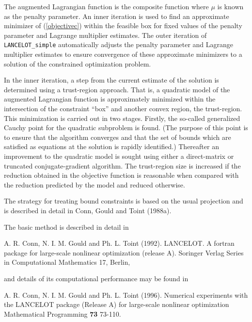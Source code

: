 \documentclass{galahad}
\newcommand{\packagename}{LANCELOT\_simple}
\begin{document}
The augmented Lagrangian function is the composite function
where $\mu$ is known as the penalty parameter.  An inner iteration is
used to find an approximate minimizer of (\ref{objectivec}) within the
feasible box for fixed values of the penalty parameter and Lagrange
multiplier estimates. The outer iteration of {\tt \packagename}
automatically adjusts the penalty parameter and Lagrange multiplier
estimates to ensure convergence of these approximate minimizers to a
solution of the constrained optimization problem.

In the inner iteration, a step from the current estimate of the solution
is determined using a trust-region approach.  That is, a quadratic model
of the augmented Lagrangian function is approximately minimized within
the intersection of the constraint ``box'' and another convex region,
the trust-region.  This minimization is carried out in two stages.
Firstly, the so-called generalized Cauchy point for the quadratic
subproblem is found.  (The purpose of this point is to ensure that the
algorithm converges and that the set of bounds which are satisfied as
equations at the solution is rapidly identified.)  Thereafter an
improvement to the quadratic model is sought using either a
direct-matrix or truncated conjugate-gradient algorithm. The
trust-region size is increased if the reduction obtained in the
objective function is reasonable when compared with the reduction
predicted by the model and reduced otherwise.

The strategy for treating bound constraints is based on the usual
projection and is described in detail in Conn, Gould and Toint (1988a).

\galreferences
\vspace*{1mm}

\noindent
The basic method is described in detail in
\vspace*{1mm}

\noindent
A. R. Conn, N. I. M. Gould and Ph. L. Toint (1992).
LANCELOT. A fortran package for large-scale nonlinear optimization
(release A). Soringer Verlag Series in Computational Mathematics 17,
Berlin,

\noindent
and details of its computational performance may be found in

\noindent
A. R. Conn, N. I. M. Gould and Ph. L. Toint (1996).
Numerical experiments with the {\sf LANCELOT} package
(Release A) for large-scale nonlinear optimization
Mathematical Programming {\bf 73} 73-110.
\end{document}
